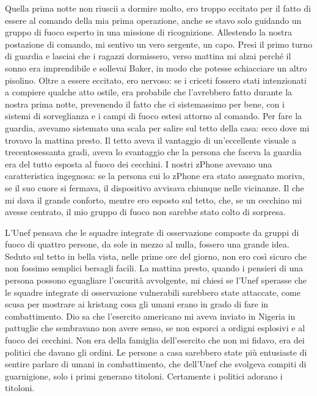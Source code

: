 Quella prima notte non riuscii a dormire molto, ero troppo eccitato per
il fatto di essere al comando della mia prima operazione, anche se stavo
solo guidando un gruppo di fuoco esperto in una missione di
ricognizione. Allestendo la nostra postazione di comando, mi sentivo un
vero sergente, un capo. Presi il primo turno di guardia e lasciai che i
ragazzi dormissero, verso mattina mi alzai perché il sonno era
imprendibile e sollevai Baker, in modo che potesse schiacciare un altro
pisolino. Oltre a essere eccitato, ero nervoso: se i criceti fossero
stati intenzionati a compiere qualche atto ostile, era probabile che
l'avrebbero fatto durante la nostra prima notte, prevenendo il fatto che
ci sistemassimo per bene, con i sistemi di sorveglianza e i campi di
fuoco estesi attorno al comando. Per fare la guardia, avevamo sistemato
una scala per salire sul tetto della casa: ecco dove mi trovavo la
mattina presto. Il tetto aveva il vantaggio di un'eccellente visuale a
trecentosessanta gradi, aveva lo svantaggio che la persona che faceva la
guardia era del tutto esposta al fuoco dei cecchini. I nostri zPhone
avevano una caratteristica ingegnosa: se la persona cui lo zPhone era
stato assegnato moriva, se il suo cuore si fermava, il dispositivo
avvisava chiunque nelle vicinanze. Il che mi dava il grande conforto,
mentre ero esposto sul tetto, che, se un cecchino mi avesse centrato, il
mio gruppo di fuoco non sarebbe stato colto di sorpresa.

L'Unef pensava che le squadre integrate di osservazione composte da
gruppi di fuoco di quattro persone, da sole in mezzo al nulla, fossero
una grande idea. Seduto sul tetto in bella vista, nelle prime ore del
giorno, non ero così sicuro che non fossimo semplici bersagli facili. La
mattina presto, quando i pensieri di una persona possono eguagliare
l'oscurità avvolgente, mi chiesi se l'Unef sperasse che le squadre
integrate di osservazione vulnerabili sarebbero state attaccate, come
scusa per mostrare ai kristang cosa gli umani erano in grado di fare in
combattimento. Dio sa che l'esercito americano mi aveva inviato in
Nigeria in pattuglie che sembravano non avere senso, se non esporci a
ordigni esplosivi e al fuoco dei cecchini. Non era della famiglia
dell'esercito che non mi fidavo, era dei politici che davano gli ordini.
Le persone a casa sarebbero state più entusiaste di sentire parlare di
umani in combattimento, che dell'Unef che svolgeva compiti di
guarnigione, solo i primi generano titoloni. Certamente i politici
adorano i titoloni.

